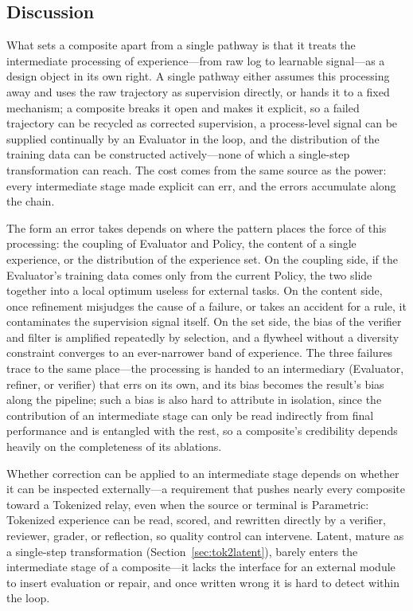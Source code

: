 \subsection{Discussion}

What sets a composite apart from a single pathway is that it treats the intermediate processing of experience---from raw log to learnable signal---as a design object in its own right. A single pathway either assumes this processing away and uses the raw trajectory as supervision directly, or hands it to a fixed mechanism; a composite breaks it open and makes it explicit, so a failed trajectory can be recycled as corrected supervision, a process-level signal can be supplied continually by an Evaluator in the loop, and the distribution of the training data can be constructed actively---none of which a single-step transformation can reach. The cost comes from the same source as the power: every intermediate stage made explicit can err, and the errors accumulate along the chain.

The form an error takes depends on where the pattern places the force of this processing: the coupling of Evaluator and Policy, the content of a single experience, or the distribution of the experience set. On the coupling side, if the Evaluator's training data comes only from the current Policy, the two slide together into a local optimum useless for external tasks. On the content side, once refinement misjudges the cause of a failure, or takes an accident for a rule, it contaminates the supervision signal itself. On the set side, the bias of the verifier and filter is amplified repeatedly by selection, and a flywheel without a diversity constraint converges to an ever-narrower band of experience. The three failures trace to the same place---the processing is handed to an intermediary (Evaluator, refiner, or verifier) that errs on its own, and its bias becomes the result's bias along the pipeline; such a bias is also hard to attribute in isolation, since the contribution of an intermediate stage can only be read indirectly from final performance and is entangled with the rest, so a composite's credibility depends heavily on the completeness of its ablations.

Whether correction can be applied to an intermediate stage depends on whether it can be inspected externally---a requirement that pushes nearly every composite toward a Tokenized relay, even when the source or terminal is Parametric: Tokenized experience can be read, scored, and rewritten directly by a verifier, reviewer, grader, or reflection, so quality control can intervene. Latent, mature as a single-step transformation (Section~\ref{sec:tok2latent}), barely enters the intermediate stage of a composite---it lacks the interface for an external module to insert evaluation or repair, and once written wrong it is hard to detect within the loop.

